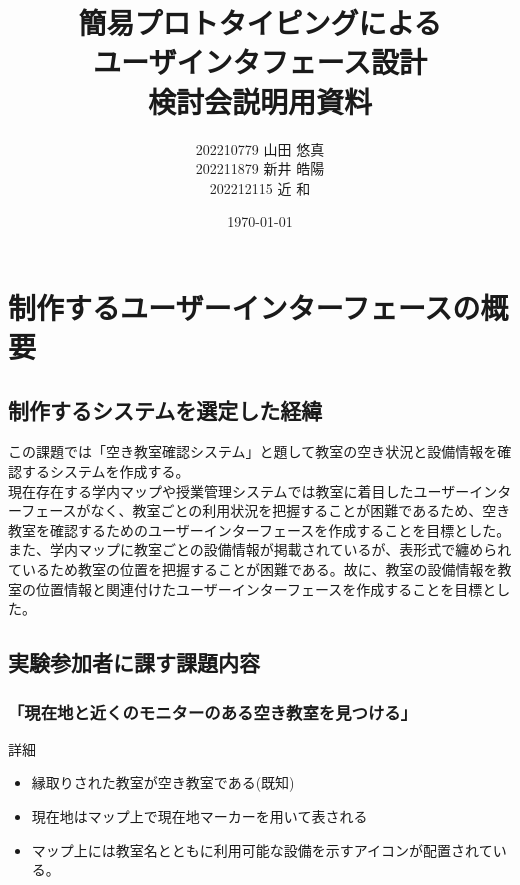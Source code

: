 \documentclass[12pt,a4paper,dvipdf]{jsarticle}
\title{簡易プロトタイピングによる\\ユーザインタフェース設計\\検討会説明用資料}
\author{202210779 山田 悠真\\202211879 新井 皓陽\\202212115 近 和}
\date{\today}
\begin{document}
\maketitle
\newpage


\section{制作するユーザーインターフェースの概要}
\subsection{制作するシステムを選定した経緯}
この課題では「空き教室確認システム」と題して教室の空き状況と設備情報を確認するシステムを作成する。\\
現在存在する学内マップや授業管理システムでは教室に着目したユーザーインターフェースがなく、教室ごとの利用状況を把握することが困難であるため、空き教室を確認するためのユーザーインターフェースを作成することを目標とした。また、学内マップに教室ごとの設備情報が掲載されているが、表形式で纏められているため教室の位置を把握することが困難である。故に、教室の設備情報を教室の位置情報と関連付けたユーザーインターフェースを作成することを目標とした。
\subsection{実験参加者に課す課題内容}
\subsubsection{「現在地と近くのモニターのある空き教室を見つける」}
詳細
\begin{itemize}
    \item 縁取りされた教室が空き教室である(既知)
    \item 現在地はマップ上で現在地マーカーを用いて表される
    \item マップ上には教室名とともに利用可能な設備を示すアイコンが配置されている。
\end{itemize}
\end{document}
